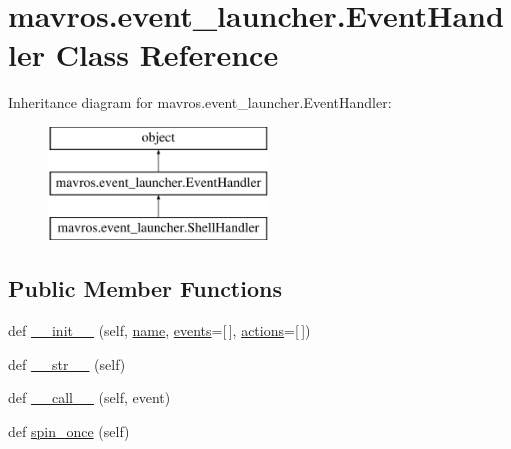 \hypertarget{classmavros_1_1event__launcher_1_1EventHandler}{}\section{mavros.\+event\+\_\+launcher.\+Event\+Handler Class Reference}
\label{classmavros_1_1event__launcher_1_1EventHandler}
Inheritance diagram for mavros.\+event\+\_\+launcher.\+Event\+Handler\+:\begin{figure}[H]
\begin{center}
\leavevmode
\includegraphics[height=3.000000cm]{classmavros_1_1event__launcher_1_1EventHandler}
\end{center}
\end{figure}
\subsection*{Public Member Functions}
\begin{DoxyCompactItemize}
\item 
def \mbox{\hyperlink{classmavros_1_1event__launcher_1_1EventHandler_a77e6da51e2d05f00f74d32167be47ba5}{\+\_\+\+\_\+init\+\_\+\+\_\+}} (self, \mbox{\hyperlink{classmavros_1_1event__launcher_1_1EventHandler_a09c331d1fc6308e8439779f0e15b83c2}{name}}, \mbox{\hyperlink{classmavros_1_1event__launcher_1_1EventHandler_ab47ae1dad36ee9e1925ccacda87475d9}{events}}=\mbox{[}$\,$\mbox{]}, \mbox{\hyperlink{classmavros_1_1event__launcher_1_1EventHandler_a9b4f8bcde66b078510a28ed6c10c683b}{actions}}=\mbox{[}$\,$\mbox{]})
\item 
def \mbox{\hyperlink{classmavros_1_1event__launcher_1_1EventHandler_a1b2afe8c71a0f039c10ebd68234d30e1}{\+\_\+\+\_\+str\+\_\+\+\_\+}} (self)
\item 
def \mbox{\hyperlink{classmavros_1_1event__launcher_1_1EventHandler_a4843977767858da045211d4814530d01}{\+\_\+\+\_\+call\+\_\+\+\_\+}} (self, event)
\item 
def \mbox{\hyperlink{classmavros_1_1event__launcher_1_1EventHandler_a0d51c6a1ddc739d191fad148fa51dcd1}{spin\+\_\+once}} (self)
\end{DoxyCompactItemize}
